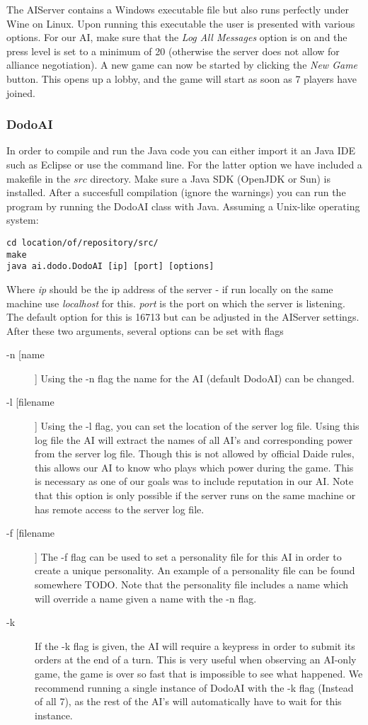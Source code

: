 \documentclass[a4paper]{article} %
\begin{document}
The AIServer contains a Windows executable file but also runs perfectly under Wine on Linux. Upon running this executable the user is presented with various options. For our AI, make sure that the \textit{Log All Messages} option is on and the press level is set to a minimum of 20 (otherwise the server does not allow for alliance negotiation). A new game can now be started by clicking the \textit{New Game} button. This opens up a lobby, and the game will start as soon as 7 players have joined.     

\subsubsection{DodoAI}
In order to compile and run the Java code you can either import it an Java IDE such as Eclipse or use the command line. For the latter option we have included a makefile in the $src$ directory. Make sure a Java SDK (OpenJDK or Sun) is installed. After a succesfull compilation (ignore the warnings) you can run the program by running the DodoAI class with Java. Assuming a Unix-like operating system:       
\begin{lstlisting}[frame=single] 
cd location/of/repository/src/
make
java ai.dodo.DodoAI [ip] [port] [options]
\end{lstlisting}

Where \textit{ip} should be the ip address of the server - if run locally on the same machine use \textit{localhost} for this. \textit{port} is the port on which the server is listening. The default option for this is 16713 but can be adjusted in the AIServer settings. After these two arguments, several options can be set with flags

\begin{description}
\item[-n [name]] Using the -n flag the name for the AI (default DodoAI) can be changed. 
\item[-l [filename]] Using the -l flag, you can set the location of the server log file. Using this log file the AI will extract the names of all AI's and corresponding power from the server log file. Though this is not allowed by official Daide rules, this allows our AI to know who plays which power during the game. This is necessary as one of our goals was to include reputation in our AI. Note that this option is only possible if the server runs on the same machine or has remote access to the server log file.  
\item[-f [filename]] The -f flag can be used to set a personality file for this AI in order to create a unique personality. An example of a personality file can be found somewhere TODO. Note that the personality file includes a name which will override a name given a name with the -n flag.  %
\item[-k] If the -k flag is given, the AI will require a keypress in order to submit its orders at the end of a turn. This is very useful when observing an AI-only game, the game is over so fast that is impossible to see what happened. We recommend running a single instance of DodoAI with the -k flag (Instead of all 7), as the rest of the AI's will automatically have to wait for this instance.  
\end{description} 
\end{document}

